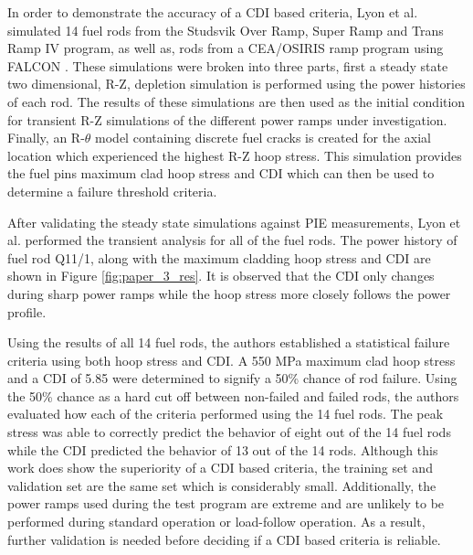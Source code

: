 \documentclass[edeposit,fullpage,11pt]{uiucthesis2009}
\begin{document}
In order to demonstrate the accuracy of a \gls{CDI} based criteria, Lyon et al. simulated 14 fuel rods from the Studsvik Over Ramp, Super Ramp and Trans Ramp IV program, as well as, rods from a CEA/OSIRIS ramp program using FALCON \cite{killeen_experimental_2004}. 
These simulations were broken into three parts, first a steady state two dimensional, R-Z, depletion simulation is performed using the power histories of each rod.
The results of these simulations are then used as the initial condition for transient R-Z simulations of the different power ramps under investigation.
Finally, an R-$\theta$ model containing discrete fuel cracks is created for the axial location which experienced the highest R-Z hoop stress.
This simulation provides the fuel pins maximum clad hoop stress and \gls{CDI} which can then be used to determine a failure threshold criteria.

After validating the steady state simulations against \gls{PIE} measurements, Lyon et al. performed the transient analysis for all of the fuel rods. 
The power history of fuel rod Q11/1, along with the maximum cladding hoop stress and \gls{CDI} are shown in Figure \ref{fig:paper_3_res}.
It is observed that the \gls{CDI} only changes during sharp power ramps while the hoop stress more closely follows the power profile.

Using the results of all 14 fuel rods, the authors established a statistical failure criteria using both hoop stress and \gls{CDI}.
A 550 MPa maximum clad hoop stress  and a \gls{CDI} of 5.85 were determined to signify a 50\% chance of rod failure.
Using the 50\% chance as a hard cut off between non-failed and failed rods, the authors evaluated how each of the criteria performed using the 14 fuel rods.
The peak stress was able to correctly predict the behavior of eight out of the 14 fuel rods while the \gls{CDI} predicted the behavior of 13 out of the 14 rods.
Although this work does show the superiority of a \gls{CDI} based criteria, the training set and validation set are the same set which is considerably small.
Additionally, the power ramps used during the test program are extreme and are unlikely to be performed during standard operation or load-follow operation.
As a result, further validation is needed before deciding if a \gls{CDI} based criteria is reliable.
 
\end{document}
